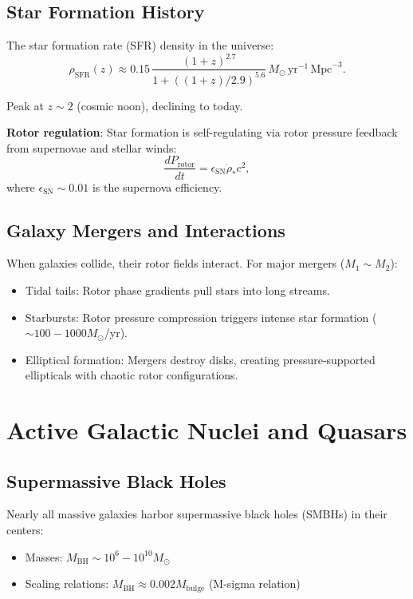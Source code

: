 \documentclass[12pt,a4paper]{article}
\theoremstyle{definition}
\theoremstyle{remark}
\begin{document}
\subsection{Star Formation History}

The star formation rate (SFR) density in the universe:
\begin{equation}
\rho_{\text{SFR}}(z) \approx 0.15 \, \frac{(1+z)^{2.7}}{1 + ((1+z)/2.9)^{5.6}} \, M_\odot \, \text{yr}^{-1} \, \text{Mpc}^{-3}.
\end{equation}

Peak at $z \sim 2$ (cosmic noon), declining to today.

\textbf{Rotor regulation}: Star formation is self-regulating via rotor pressure feedback from supernovae and stellar winds:
\begin{equation}
\frac{dP_{\text{rotor}}}{dt} = \epsilon_{\text{SN}} \dot{\rho}_* c^2,
\end{equation}
where $\epsilon_{\text{SN}} \sim 0.01$ is the supernova efficiency.

\subsection{Galaxy Mergers and Interactions}

When galaxies collide, their rotor fields interact. For major mergers ($M_1 \sim M_2$):

\begin{itemize}
\item Tidal tails: Rotor phase gradients pull stars into long streams.
\item Starbursts: Rotor pressure compression triggers intense star formation ($\sim 100-1000 M_\odot$/yr).
\item Elliptical formation: Mergers destroy disks, creating pressure-supported ellipticals with chaotic rotor configurations.
\end{itemize}

\section{Active Galactic Nuclei and Quasars}

\subsection{Supermassive Black Holes}

Nearly all massive galaxies harbor supermassive black holes (SMBHs) in their centers:
\begin{itemize}
\item Masses: $M_{\text{BH}} \sim 10^6-10^{10} M_\odot$
\item Scaling relations: $M_{\text{BH}} \approx 0.002 M_{\text{bulge}}$ (M-sigma relation)
\end{itemize}
\end{document}
